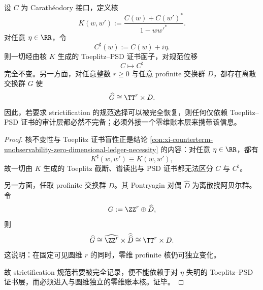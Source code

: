 \begin{theorem}\label{thm:conclusion-toeplitz-gauge-blindness-zero-dimensional-ledger-necessity}
设 \(C\) 为 Carath\'eodory 接口，定义核
\[
K(w,w'):=\frac{C(w)+C(w')^\ast}{1-ww'^\ast}.
\]
对任意 \(\eta\in\RR\)，令
\[
C^\sharp(w):=C(w)+i\eta.
\]
则一切经由核 \(K\) 生成的 Toeplitz--PSD 证书函子，对规范位移
\[
C\longmapsto C^\sharp
\]
完全不变。另一方面，对任意整数 \(r\ge 0\) 与任意 profinite 交换群 \(D\)，都存在离散交换群 \(G\) 使
\[
\widehat G\cong \TT^r\times D.
\]
因此，若要求 strictification 的规范选择可以被完全恢复，则任何仅依赖 Toeplitz--PSD 证书的审计层都必然不完备；必须外接一个零维账本层来携带该信息。
\end{theorem}
\begin{proof}
核不变性与 Toeplitz 证书盲性正是结论 \ref{con:xi-counterterm-unobservability-zero-dimensional-ledger-necessity} 的内容：对任意 \(\eta\in\RR\)，都有
\[
K^\sharp(w,w')\equiv K(w,w'),
\]
故一切由 \(K\) 生成的 Toeplitz 截断、谱读出与 PSD 证书都无法区分 \(C\) 与 \(C^\sharp\)。

另一方面，任取 profinite 交换群 \(D\)。其 Pontryagin 对偶 \(\widehat D\) 为离散挠阿贝尔群。令
\[
G:=\ZZ^r\oplus \widehat D,
\]
则
\[
\widehat G\cong \widehat{\ZZ^r}\times \widehat{\widehat D}\cong \TT^r\times D.
\]
这说明：在固定可见圆维 \(r\) 的同时，零维 profinite 核仍可独立变化。

故 strictification 规范若要被完全记录，便不能依赖于对 \(\eta\) 失明的 Toeplitz--PSD 证书层，而必须进入与圆维独立的零维账本核。证毕。
\end{proof}

